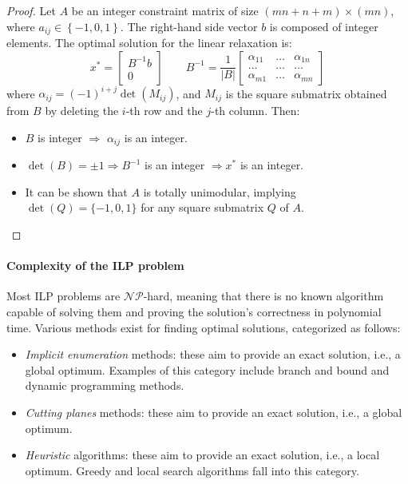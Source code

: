 \begin{proof}
    Let $A$ be an integer constraint matrix of size $\left( mn + n + m \right) \times \left( mn \right)$, where $a_{ij} \in \left\{ -1, 0, 1 \right\}$.
    The right-hand side vector $b$ is composed of integer elements.
    The optimal solution for the linear relaxation is:
    \[ x^\ast = \begin{bmatrix}
        B^{-1} b \\ 0
    \end{bmatrix}
    \qquad
    B^{-1} = \dfrac{1}{\left\lvert B\right\rvert}
    \begin{bmatrix}
        \alpha_{11} & \dots  & \alpha_{1n} \\
        \ldots      & \ldots & \ldots      \\
        \alpha_{m1} & \dots  & \alpha_{mn}
    \end{bmatrix}
    \]
    where $\alpha_{ij} = (-1)^{i+j} \det\left( M_{ij} \right)$, and $M_{ij}$ is the square submatrix obtained from $B$ by deleting the $i$-th row and the $j$-th column.
    Then:
    \begin{itemize}
        \item $B$ is integer $\Rightarrow$ $\alpha_{ij}$ is an integer.
        \item $\det\left( B \right) = \pm 1 \Rightarrow B^{-1}$ is an integer $\Rightarrow x^\ast$ is an integer.
        \item It can be shown that $A$ is totally unimodular, implying $\det\left( Q \right) = \{-1, 0, 1\}$ for any square submatrix $Q$ of $A$.    
    \end{itemize}
\end{proof}

\paragraph{Complexity of the ILP problem}
Most ILP problems are $\mathcal{NP}$-hard, meaning that there is no known algorithm capable of solving them and proving the solution's correctness in polynomial time. 
Various methods exist for finding optimal solutions, categorized as follows:
\begin{itemize}
    \item \textit{Implicit enumeration} methods: these aim to provide an exact solution, i.e., a global optimum. 
        Examples of this category include branch and bound and dynamic programming methods.
    \item \textit{Cutting planes} methods: these aim to provide an exact solution, i.e., a global optimum. 
    \item \textit{Heuristic} algorithms: these aim to provide an exact solution, i.e., a local optimum. 
        Greedy and local search algorithms fall into this category. 
\end{itemize}